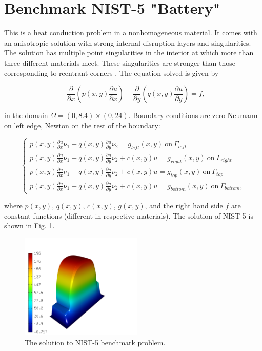 \section{Benchmark NIST-5 "Battery"}
\label{sec:bench-5}

This is a heat conduction problem in a nonhomogeneous material.
It comes with an anisotropic solution with strong internal disruption
layers and singularities.
The solution has multiple point singularities in the interior at which
more than three different materials meet. These singularities are stronger than those
corresponding to reentrant corners \cite{demkowicz-1}.
The equation solved is given by

\begin{equation} \label{heat-conduction}
-\frac{\partial }{\partial x}\left(p(x, y)\frac{\partial u}{\partial x}\right)
-\frac{\partial }{\partial y}\left(q(x, y)\frac{\partial u}{\partial y}\right) = f,
\end{equation}

in the domain $\Omega = (0, 8.4) \times (0, 24)$. Boundary conditions are zero Neumann on left edge, Newton on the rest of the boundary:

\begin{equation}
\left\{
\begin{array}{l}
\displaystyle p(x, y)\frac{\partial u}{\partial x}\nu_1 + q(x, y)\frac{\partial u}{\partial y}\nu_2 = g_{left}(x, y) \ \mbox{on} \  \Gamma_{left} \\
\displaystyle p(x, y)\frac{\partial u}{\partial x}\nu_1 + q(x, y)\frac{\partial u}{\partial y}\nu_2 + c(x, y)u = g_{right}(x, y) \ \mbox{on} \ \Gamma_{right} \\
\displaystyle p(x, y)\frac{\partial u}{\partial x}\nu_1 + q(x, y)\frac{\partial u}{\partial y}\nu_2 + c(x, y)u = g_{top}(x, y) \ \mbox{on} \ \Gamma_{top} \\
\displaystyle p(x, y)\frac{\partial u}{\partial x}\nu_1 + q(x, y)\frac{\partial u}{\partial y}\nu_2 + c(x, y)u = g_{bottom}(x, y) \ \mbox{on} \ \Gamma_{bottom},
\end{array}
\right.
\end{equation}

where $p(x, y)$, $q(x, y)$, $c(x, y)$, $g(x, y)$, and the right hand
side $f$ are constant functions (different in respective materials).
The solution of NIST-5 is shown in Fig. \ref{fig:sln-nist05}.

\begin{figure}[!ht]
\centering
\includegraphics[height=5cm]{nist/nist-5/solution.png}
\caption{The solution to NIST-5 benchmark problem.}
\label{fig:sln-nist05}
\end{figure}

